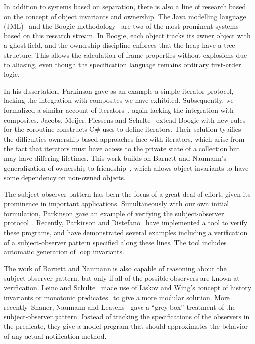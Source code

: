 \documentclass[preprint,natbib]{sigplanconf}
\begin{document}
In addition to systems based on separation, there is also a line of
research based on the concept of object invariants and ownership.  The
Java modelling language (JML)~\cite{jml} and the Boogie
methodology~\cite{boogie} are two of the most prominent systems based
on this research stream. In Boogie, each object tracks its owner
object with a ghost field, and the ownership discipline enforces that
the heap have a tree structure. This allows the calculation of frame
properties without explosions due to aliasing, even though the
specification language remains ordinary first-order logic.

In his dissertation, Parkinson gave as an example a simple iterator
protocol, lacking the integration with composites we have exhibited.
Subsequently, we formalized a similar account of
iterators~\cite{iterator}, again lacking the integration with
composites. Jacobs, Meijer, Piessens and
Schulte~\cite{iterators-revisited} extend Boogie with new rules for
the coroutine constructs C\# uses to define iterators. Their solution
typifies the difficulties ownership-based approaches face with
iterators, which arise from the fact that iterators must have access
to the private state of a collection but may have differing
lifetimes. This work builds on Barnett and Naumann's generalization of
ownership to friendship~\cite{friends}, which allows object invariants
to have some dependency on non-owned objects.

The subject-observer pattern has been the focus of a great deal of effort,
given its prominence in important applications. Simultaneously with our own
initial formulation, Parkinson gave an example of verifying the
subject-observer protocol~\cite{parkinson-so}. Recently, Parkinson and
Distefano~\cite{jstar-parkinson-distefano} have implemented a tool to verify
these programs, and have demonstrated several examples including a verification
of a subject-observer pattern specified along these lines. The tool includes
automatic generation of loop invariants. 

The work of Barnett and Naumann is also capable of reasoning about the
subject-observer pattern, but only if all of the possible observers
are known at verification.  Leino and Schulte~\cite{boogie-sub-obs}
made use of Liskov and Wing's concept of history invariants or
monotonic predicates~\cite{liskov-wing} to give a more modular
solution. More recently, Shaner, Naumann and Leavens~\cite{ShanerLN07}
gave a ``grey-box'' treatment of the subject-observer pattern.
Instead of tracking the specifications of the observers in the
predicate, they give a model program that should approximates the
behavior of any actual notification method.
\end{document}
